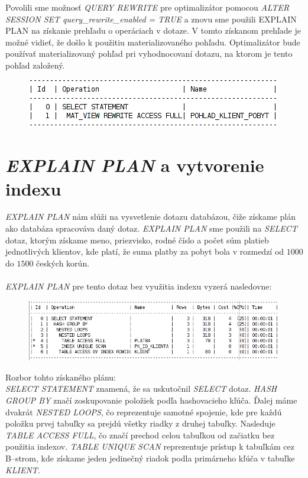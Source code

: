 \documentclass[a4paper,11pt,titlepage]{article}[11.3.2016]
\begin{document}
\noindent
Povolili sme možnosť \textit{QUERY REWRITE} pre optimalizátor pomocou \textit{ALTER SESSION SET query\_rewrite\_enabled = TRUE} a znovu sme použili EXPLAIN PLAN na získanie prehľadu o operáciach v dotaze. V tomto získanom prehľade je možné vidieť, že došlo k použitiu materializovaného pohľadu. Optimalizátor bude používať materializovaný pohľad pri vyhodnocovaní dotazu, na ktorom je tento pohľad založený.

\begin{center}
\begin{figure}[h]
    \includegraphics{matview.png}
\end{figure}
\end{center}

\newpage

\section{\textit{EXPLAIN PLAN} a vytvorenie indexu}
\textit{EXPLAIN PLAN} nám slúži na vysvetlenie dotazu databázou, čiže získame plán ako databáza spracováva daný dotaz. \textit{EXPLAIN PLAN} sme použili na \textit{SELECT} dotaz, ktorým získame meno, priezvisko, rodné číslo a počet súm platieb jednotlivých klientov, kde platí, že suma platby za pobyt bola v rozmedzí od $1000$ do $1500$ českých korún.\\
\\
\textit{EXPLAIN PLAN} pre tento dotaz bez využitia indexu vyzerá nasledovne:
\begin{center}
\begin{figure}[h]
    \includegraphics[scale=0.7]{pred.png}
\end{figure}
\end{center}

\noindent
Rozbor tohto získaného plánu:\\
\textit{SELECT STATEMENT} znamená, že sa uskutočnil \textit{SELECT} dotaz. \textit{HASH GROUP BY} značí zoskupovanie položiek podľa hashovacieho kľúča. Ďalej máme dvakrát \textit{NESTED LOOPS}, čo reprezentuje samotné spojenie, kde pre každú položku prvej tabuľky sa prejdú všetky riadky z druhej tabuľky. Nasleduje \textit{TABLE ACCESS FULL}, čo značí prechod celou tabuľkou od začiatku bez použitia indexov. \textit{TABLE UNIQUE SCAN} reprezentuje prístup k tabuľkám cez \mbox{B--strom}, kde získame jeden jedinečný riadok podla primárneho kľúča v tabuľke \textit{KLIENT}.\\
\end{document}
